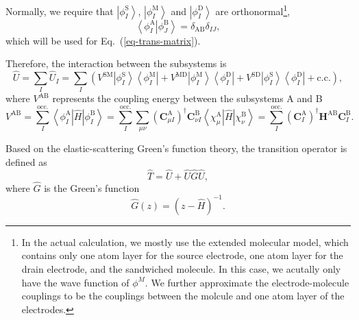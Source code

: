 \documentclass[a4paper,11pt,twoside,openright]{book}
\begin{document}
Normally, we require that $\left|\phi_{I}^{\text{S}}\right\rangle$, $\left|\phi_{I}^{\text{M}}\right\rangle$
and $\left|\phi_{I}^{\text{D}}\right\rangle$ are orthonormal\footnote{In the actual calculation, we mostly
use the extended molecular model, which contains only one atom layer for the source electrode, one
atom layer for the drain electrode, and the sandwiched molecule. In this case, we acutally only have
the wave function of $\phi^{M}$. We further approximate the electrode-molecule couplings to be the
couplings between the molcule and one atom layer of the electrodes.},
\begin{equation}
  \left\langle\left.\phi_{I}^{\text{A}}\right|\phi_{J}^{\text{B}}\right\rangle=\delta_{\text{AB}}\delta_{IJ},
\end{equation}
which will be used for Eq.~(\ref{eq-trans-matrix}).

Therefore, the interaction between the subsystems is\cite{Wang-PCCP3-5017,Jiang-JCP124-034708}
\begin{equation}
  \label{eq-oper-interaction}
  \hat{U}=\sum_{I}\hat{U}_{I}
  =\sum_{I}\left(V^{\text{SM}}\left|\phi_{I}^{\text{S}}\right\rangle\left\langle\phi_{I}^{\text{M}}\right|%
  +V^{\text{MD}}\left|\phi_{I}^{\text{M}}\right\rangle\left\langle\phi_{I}^{\text{D}}\right|%
  +V^{\text{SD}}\left|\phi_{I}^{\text{S}}\right\rangle\left\langle\phi_{I}^{\text{D}}\right|%
  +\text{c.c.}\right),
\end{equation}
where $V^{\text{AB}}$ represents the coupling energy between the subsystems A and B
\begin{equation}
  V^{\text{AB}}
  =\sum_{I}^{\text{occ.}}\left\langle\phi_{I}^{\text{A}}\left|\hat{H}\right|\phi_{I}^{\text{B}}\right\rangle
  =\sum_{I}^{\text{occ.}}\sum_{\mu\nu}\left(\mathbf{C}_{\mu I}^{\text{A}}\right)^{\dagger}\mathbf{C}_{\nu I}^{\text{B}}%
    \left\langle\chi_{\mu}^{\text{A}}\left|\hat{H}\right|\chi_{\nu}^{\text{B}}\right\rangle%
  =\sum_{I}^{\text{occ.}}\left(\mathbf{C}_{I}^{\text{A}}\right)^{\dagger}\mathbf{H}^{\text{AB}}\mathbf{C}_{I}^{\text{B}}.
\end{equation}

Based on the elastic-scattering Green's function theory, the transition operator is defined as
\begin{equation}
  \hat{T}=\hat{U}+\hat{U}\hat{G}\hat{U},
\end{equation}
where $\hat{G}$ is the Green's function
\begin{equation}
  \hat{G}(z)=\left(z-\hat{H}\right)^{-1}.
\end{equation}
\end{document}
